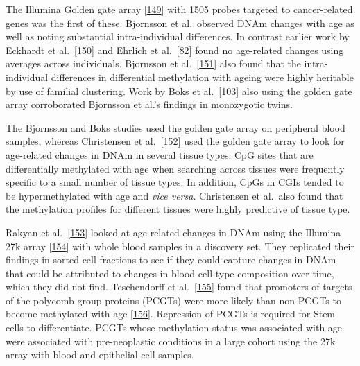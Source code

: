 \documentclass[
]{book}
\begin{document}
The Illumina Golden gate array {[}\protect\hyperlink{ref-Bibikova2006}{149}{]} with 1505 probes targeted to cancer-related genes was the first of these.
Bjornsson et al.~observed DNAm changes with age as well as noting substantial intra-individual differences.
In contrast earlier work by Eckhardt et al.~{[}\protect\hyperlink{ref-Eckhardt2006}{150}{]} and Ehrlich et al.~{[}\protect\hyperlink{ref-Ehrlich1982}{82}{]} found no age-related changes using averages across individuals.
Bjornsson et al.~{[}\protect\hyperlink{ref-Bjornsson2008}{151}{]} also found that the intra-individual differences in differential methylation with ageing were highly heritable by use of familial clustering.
Work by Boks et al.~{[}\protect\hyperlink{ref-Boks2009}{103}{]} also using the golden gate array corroborated Bjornsson et al.'s findings in monozygotic twins.

The Bjornsson and Boks studies used the golden gate array on peripheral blood samples, whereas Christensen et al.~{[}\protect\hyperlink{ref-Christensen2009}{152}{]} used the golden gate array to look for age-related changes in DNAm in several tissue types.
CpG sites that are differentially methylated with age when searching across tissues were frequently specific to a small number of tissue types.
In addition, CpGs in CGIs tended to be hypermethylated with age and \emph{vice versa}.
Christensen et al.~also found that the methylation profiles for different tissues were highly predictive of tissue type.

Rakyan et al.~{[}\protect\hyperlink{ref-Rakyan2010}{153}{]} looked at age-related changes in DNAm using the Illumina 27k array {[}\protect\hyperlink{ref-Bibikova2009}{154}{]} with whole blood samples in a discovery set.
They replicated their findings in sorted cell fractions to see if they could capture changes in DNAm that could be attributed to changes in blood cell-type composition over time, which they did not find.
Teschendorff et al.~{[}\protect\hyperlink{ref-Teschendorff2010}{155}{]} found that promoters of targets of the polycomb group proteins (PCGTs) were more likely than non-PCGTs to become methylated with age {[}\protect\hyperlink{ref-Jung2015}{156}{]}.
Repression of PCGTs is required for Stem cells to differentiate.
PCGTs whose methylation status was associated with age were associated with pre-neoplastic conditions in a large cohort using the 27k array with blood and epithelial cell samples.
\end{document}
